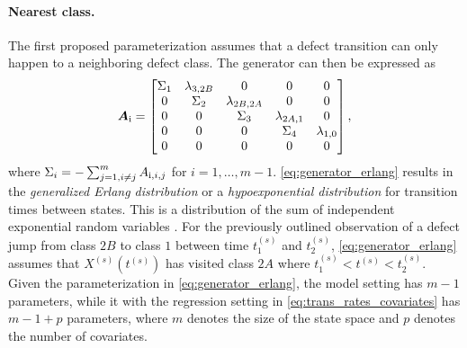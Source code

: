 \documentclass{article}
\newcommand{\RN}[1]{\textup{\uppercase\expandafter{\romannumeral#1}}}
\begin{document}
\paragraph{Nearest class.} 
The first proposed parameterization assumes that a defect transition can only happen to a neighboring defect class. The generator can then be expressed as
\begin{align}
    \bm{A}_{\RN{1}} = \begin{bmatrix} 
    \Sigma_1 & \lambda_{3,2B} & 0 & 0 & 0 \\
    0 & \Sigma_2 & \lambda_{2B, 2A} & 0 & 0 \\
    0 & 0 & \Sigma_3 & \lambda_{2A, 1} & 0 \\
    0 & 0 & 0 & \Sigma_4 & \lambda_{1, 0} \\
    0 & 0 & 0 & 0 & 0 \\
    \end{bmatrix}, \label{eq:generator_erlang}
\end{align}
where $\Sigma_i = -\sum_{j=1, i \neq j}^m A_{\RN{1},i,j}$ for $i = 1, \dots, m-1$. 
\cref{eq:generator_erlang} results in the \textit{generalized Erlang distribution} or a \textit{hypoexponential distribution} for transition times between states. This is a distribution of the sum of independent exponential random variables \citep[Section 3.1]{bladt_nielsen}. For the previously outlined observation of a defect jump from class $2B$ to class $1$ between time $t_1^{(s)}$ and $t^{(s)}_2$, \cref{eq:generator_erlang} assumes that $X^{(s)}\left(t^{(s)}\right)$ has visited class $2A$ where $t^{(s)}_1 < t^{(s)} < t^{(s)}_2$.
Given the parameterization in \cref{eq:generator_erlang}, the model setting has $m-1$ parameters, while it with the regression setting in \cref{eq:trans_rates_covariates} has $m-1 + p$ parameters, where $m$ denotes the size of the state space and $p$ denotes the number of covariates.
\end{document}

